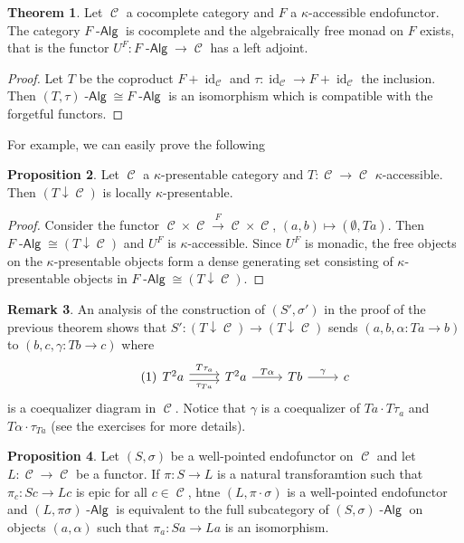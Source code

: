 \documentclass[a4paper,11pt,oneside,openany]{scrbook}
\DeclareMathOperator{\Alg}{-\mathsf{Alg}}
\newcommand{\from}{\colon}
\DeclareMathOperator{\C}{\mathcal{C}}
\DeclareMathOperator{\id}{id}
\theoremstyle{definition}
\newtheorem{thm}{Theorem}[section] %
\theoremstyle{definition}
\newtheorem{prop}[thm]{Proposition}
\newtheorem{rmk}[thm]{Remark}
\begin{document}
\begin{thm}
    Let $ \C $ a cocomplete category and $ F $ a $ \kappa $-accessible endofunctor.
    The category $ F\Alg $ is cocomplete and the algebraically free monad on $ F $ exists, that is the functor
    $ U^F \from F\Alg \to \C $ has a left adjoint.
\end{thm}
\begin{proof}
    Let $ T $ be the coproduct $ F + \id_{\C} $ and $ \tau\from \id_{\C} \to F+\id_{\C} $ the inclusion.
    Then $  (T,\tau)\Alg \cong F\Alg $ is an isomorphism which is compatible with the forgetful functors.
\end{proof}
For example, we can easily prove the following
\begin{prop}
    Let $ \C $ a $ \kappa $-presentable category and $ T \from \C \to \C $ $ \kappa $-accessible.
    Then $ (T\downarrow\C) $ is locally $ \kappa $-presentable.
\end{prop}
\begin{proof}
    Consider the functor $ \C \times \C \xrightarrow{F} \C \times \C $, $ (a,b)\mapsto (\emptyset, Ta) $.
    Then $ F\Alg \cong (T\downarrow\C) $ and $ U^F $ is $ \kappa $-accessible.
    Since $ U^F  $ is monadic, the free objects on the $ \kappa $-presentable objects form a dense generating set consisting of $ \kappa $-presentable objects in $ F\Alg \cong (T\downarrow\C) $.
\end{proof}
\begin{rmk}
    An analysis of the construction of $ (S',\sigma') $ in the proof of the previous theorem shows that $ S' \from (T\downarrow\C) \to (T\downarrow\C) $ sends $ (a,b,\alpha \from Ta \to b) $ to $ (b,c, \gamma \from Tb \to c) $ where
    \begin{displaymath}\tag{1}\label{fork1}
        \begin{tikzcd}
	    T^2 a \arrow[r,shift left, "T \tau_a"]\arrow[r,shift right, "\tau_{Ta}"']& T^2 a \arrow[r, "T\alpha" ] & Tb \arrow[r, "\gamma"]  & c
        \end{tikzcd}
    \end{displaymath}
    is a coequalizer diagram in $ \C $.
    Notice that $ \gamma $ is a coequalizer of $ Ta \cdot T\tau_a $ and $ T\alpha \cdot \tau_{Ta} $ (see the exercises for more details).
\end{rmk}
\begin{prop}
    Let $ (S,\sigma) $ be a well-pointed endofunctor on $ \C $ and let $ L\from \C \to \C $ be a functor.
    If $ \pi \from S \to L $ is a natural transforamtion such that $ \pi_c \from Sc \to Lc $ is epic for all $ c\in\C $, htne $ (L,\pi\cdot \sigma) $ is a well-pointed endofunctor and $ (L,\pi\sigma)\Alg $ is equivalent to the full subcategory of $ (S,\sigma)\Alg $ on objects $ (a,\alpha) $ such that $ \pi_a\colon Sa \to La $ is an isomorphism.
\end{prop}
\end{document}
